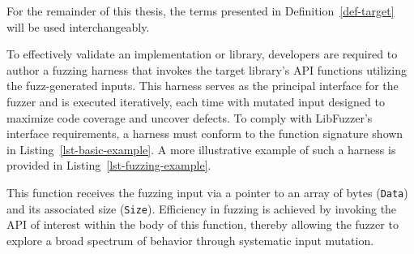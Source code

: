 \documentclass[
  a4paper,
]{scrreprt}
\newenvironment{Shaded}{\begin{snugshade}}{\end{snugshade}}
\newcommand{\ControlFlowTok}[1]{\textcolor[rgb]{0.85,0.12,0.09}{#1}}
\newcommand{\DataTypeTok}[1]{\textcolor[rgb]{0.47,0.16,0.63}{#1}}
\newcommand{\DecValTok}[1]{\textcolor[rgb]{0.47,0.16,0.63}{#1}}
\newcommand{\NormalTok}[1]{\textcolor[rgb]{0.33,0.33,0.33}{#1}}
\newcommand{\OperatorTok}[1]{\textcolor[rgb]{0.00,0.46,0.62}{#1}}
\theoremstyle{definition}
\theoremstyle{remark}
\begin{document}
For the remainder of this thesis, the terms presented in
Definition~\ref{def-target} will be used interchangeably.

To effectively validate an implementation or library, developers are
required to author a fuzzing harness that invokes the target library's
API functions utilizing the fuzz-generated inputs. This harness serves
as the principal interface for the fuzzer and is executed iteratively,
each time with mutated input designed to maximize code coverage and
uncover defects. To comply with LibFuzzer's interface requirements, a
harness must conform to the function signature shown in
Listing~\ref{lst-basic-example}. A more illustrative example of such a
harness is provided in Listing~\ref{lst-fuzzing-example}.

\begin{codelisting}

\caption[Fuzzing harness format]{\label{lst-basic-example}This function
receives the fuzzing input via a pointer to an array of bytes
(\texttt{Data}) and its associated size (\texttt{Size}). Efficiency in
fuzzing is achieved by invoking the API of interest within the body of
this function, thereby allowing the fuzzer to explore a broad spectrum
of behavior through systematic input mutation.}

\centering{

\begin{Shaded}
\begin{Highlighting}[numbers=left,,]
\DataTypeTok{int}\NormalTok{ LLVMFuzzerTestOneInput}\OperatorTok{(}\DataTypeTok{const} \DataTypeTok{uint8\_t} \OperatorTok{*}\NormalTok{Data}\OperatorTok{,} \DataTypeTok{size\_t}\NormalTok{ Size}\OperatorTok{)} \OperatorTok{\{}
\NormalTok{  DoSomethingInterestingWithData}\OperatorTok{(}\NormalTok{Data}\OperatorTok{,}\NormalTok{ Size}\OperatorTok{);}
  \ControlFlowTok{return} \DecValTok{0}\OperatorTok{;}
\OperatorTok{\}}
\end{Highlighting}
\end{Shaded}

}

\end{codelisting}%
\end{document}
